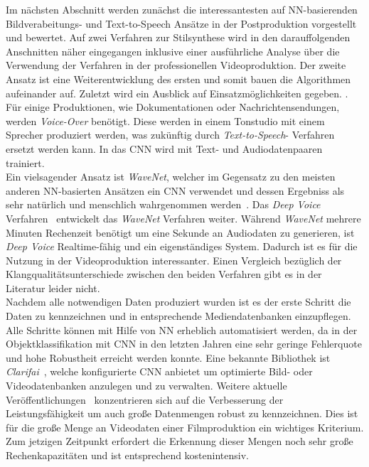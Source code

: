 \documentclass[times, 11pt,twocolumn]{article}
\begin{document}
Im nächsten Abschnitt werden zunächst die interessantesten auf NN-basierenden Bildverabeitungs- und Text-to-Speech Ansätze in der Postproduktion vorgestellt und bewertet. Auf zwei Verfahren zur Stilsynthese wird in den darauffolgenden Anschnitten näher eingegangen inklusive einer ausführliche Analyse über die Verwendung der Verfahren in der professionellen Videoproduktion. Der zweite Ansatz ist eine Weiterentwicklung des ersten und somit bauen die Algorithmen aufeinander auf. Zuletzt wird ein Ausblick auf Einsatzmöglichkeiten gegeben.
.
 \label{sec:SOTAPostproduktion}
Für einige Produktionen, wie Dokumentationen oder Nachrichtensendungen, werden \textit{Voice-Over} benötigt. Diese werden in einem Tonstudio mit einem Sprecher produziert werden, was zukünftig durch \textit{Text-to-Speech}- Verfahren ersetzt werden kann. In das CNN wird mit Text- und Audiodatenpaaren trainiert.\\
Ein vielsagender Ansatz ist \textit{WaveNet}, welcher im Gegensatz zu den meisten anderen NN-basierten Ansätzen ein CNN verwendet und dessen Ergebniss als sehr natürlich und menschlich wahrgenommen werden~\cite{OordDZSVGKSK16}. Das \textit{Deep Voice} Verfahren~\cite{DeepVoice} entwickelt das \textit{WaveNet} Verfahren weiter. Während \textit{WaveNet} mehrere Minuten Rechenzeit benötigt um eine Sekunde an Audiodaten zu generieren, ist \textit{Deep Voice} Realtime-fähig und ein eigenständiges System. Dadurch ist es für die Nutzung in der Videoproduktion interessanter. Einen Vergleich bezüglich der Klangqualitätsunterschiede zwischen den beiden Verfahren gibt es in der Literatur leider nicht.
\\

Nachdem alle notwendigen Daten produziert wurden ist es der erste Schritt die Daten zu kennzeichnen und in entsprechende Mediendatenbanken einzupflegen. Alle Schritte können mit Hilfe von NN erheblich automatisiert werden, da in der Objektklassifikation mit CNN in den letzten Jahren eine sehr geringe Fehlerquote und hohe Robustheit erreicht werden konnte. Eine bekannte Bibliothek ist \textit{Clarifai}~\cite{MITReview}, welche konfigurierte CNN anbietet um optimierte Bild- oder Videodatenbanken anzulegen und zu verwalten.  Weitere aktuelle Veröffentlichungen~\cite{Ng_VideoLabelling}\cite{Ye:VideoLabelling}\cite{KangEABZ17} konzentrieren sich auf die Verbesserung der Leistungsfähigkeit um auch große Datenmengen robust zu kennzeichnen. Dies ist für die große Menge an Videodaten einer Filmproduktion ein wichtiges Kriterium. Zum jetzigen Zeitpunkt erfordert die Erkennung dieser Mengen noch sehr große Rechenkapazitäten und ist entsprechend kostenintensiv. \\
\end{document}
